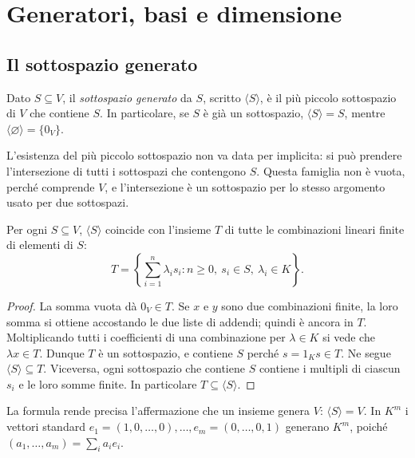 \chapter{Generatori, basi e dimensione}

\section{Il sottospazio generato}
\begin{definizione}
Dato $S\subseteq V$, il \emph{sottospazio generato} da $S$, scritto
$\langle S\rangle$, è il più piccolo sottospazio di $V$ che contiene
$S$. In particolare, se $S$ è già un sottospazio,
$\langle S\rangle=S$, mentre $\langle\varnothing\rangle=\{0_V\}$.
\end{definizione}
L'esistenza del più piccolo sottospazio non va data per implicita: si
può prendere l'intersezione di tutti i sottospazi che contengono $S$.
Questa famiglia non è vuota, perché comprende $V$, e l'intersezione è un
sottospazio per lo stesso argomento usato per due sottospazi.

\begin{teorema}
Per ogni $S\subseteq V$, $\langle S\rangle$ coincide con l'insieme
$T$ di tutte le combinazioni lineari finite di elementi di $S$:
\[
T=\left\{\sum_{i=1}^{n}\lambda_i s_i:
 n\geq0,\ s_i\in S,\ \lambda_i\in K\right\}.
\]
\end{teorema}
\begin{proof}
La somma vuota dà $0_V\in T$. Se $x$ e $y$ sono due combinazioni
finite, la loro somma si ottiene accostando le due liste di addendi;
quindi è ancora in $T$. Moltiplicando tutti i coefficienti di una
combinazione per $\lambda\in K$ si vede che $\lambda x\in T$.
Dunque $T$ è un sottospazio, e contiene $S$ perché
$s=1_Ks\in T$. Ne segue $\langle S\rangle\subseteq T$.
Viceversa, ogni sottospazio che contiene $S$ contiene i multipli di
ciascun $s_i$ e le loro somme finite. In particolare
$T\subseteq\langle S\rangle$.
\end{proof}
La formula rende precisa l'affermazione che un insieme genera $V$:
$\langle S\rangle=V$. In $K^m$ i vettori standard
$e_1=(1,0,\ldots,0),\ldots,e_m=(0,\ldots,0,1)$ generano $K^m$,
poiché $(a_1,\ldots,a_m)=\sum_i a_ie_i$.

